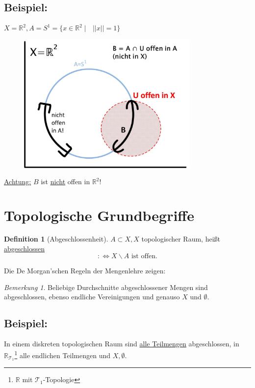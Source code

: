 \documentclass[a4paper,11pt,notitlepage]{report}
\theoremstyle{remark}
\newtheorem{remark}{Bemerkung}[chapter]
\theoremstyle{definition}
\newtheorem{definition}{Definition}[chapter]
\newcommand{\R}{{\ensuremath{\mathbb{R}}}}
\newenvironment{bsp}[1]
{
\setlength{\fboxsep}{10pt}
\subsection*{Beispiel: #1}
\begin{upshape}
}
{
\end{upshape}
}
\begin{document}
\begin{bsp}{}
$X = \R^2, A = S^1 = \{ x \in \R^2 \mid \text{ } ||x|| = 1\}$ 
\newline
\begin{figure}[h]
\centering
\includegraphics[width=0.8\textwidth]{images/Teilraumtopologie.jpg}
\end{figure}
\newline
\underline{Achtung:} $B$ ist \underline{\underline{nicht}} offen in $\R^2$!
\end{bsp}

\section{Topologische Grundbegriffe}

\begin{definition}[Abgeschlossenheit]
	$A \subset X, X$ topologischer Raum, heißt \underline{abgeschlossen} $$:\Leftrightarrow X \backslash A \text{ ist offen.}$$
\end{definition}

Die De Morgan'schen Regeln der Mengenlehre zeigen:

\begin{remark}
	Beliebige Durchschnitte abgeschlossener Mengen sind abgeschlossen, ebenso endliche Vereinigungen und genauso $X$ und $\emptyset$.
\end{remark}

\begin{bsp}{}
	In einem diskreten topologischen Raum sind \underline{alle Teilmengen} abgeschlossen, in $\R_{\mathcal{T}_1}$\footnote{$\R$ mit $\mathcal{T}_1$-Topologie} alle endlichen Teilmengen und $X, \emptyset$.
\end{bsp}
\end{document}

